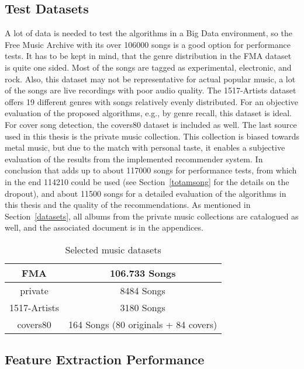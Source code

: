 \subsection{Test Datasets}\label{tdset}

A lot of data is needed to test the algorithms in a Big Data environment, so the Free Music Archive with its over 106000 songs is a good option for performance tests. It has to be kept in mind, that the genre distribution in the FMA dataset is quite one sided. Most of the songs are tagged as experimental, electronic, and rock. Also, this dataset may not be representative for actual popular music, a lot of the songs are live recordings with poor audio quality. %
The 1517-Artists dataset offers 19 different genres with songs relatively evenly distributed. For an objective evaluation of the proposed algorithms, e.g., by genre recall, this dataset is ideal. For cover song detection, the covers80 dataset is included as well.
The last source used in this thesis is the private music collection. This collection is biased towards metal music, but due to the match with personal taste, it enables a subjective evaluation of the results from the implemented recommender system.
In conclusion that adds up to about 117000 songs for performance tests, from which in the end 114210 could be used (see Section~\ref{totamsong} for the details on the dropout), and about 11500 songs for a detailed evaluation of the algorithms in this thesis and the quality of the recommendations. As mentioned in Section~\ref{datasets}, all albums from the private music collections are catalogued as well, and the associated document is in the appendices. 

\begin{table}[h]
	\begin{center}
		\begin{tabular}{|c||c|}
			\hline
			FMA & 106.733 Songs\\
			\hline
			private & 8484 Songs\\
			\hline
			1517-Artists & 3180 Songs\\
			\hline
			covers80 & 164 Songs (80 originals + 84 covers)\\
			\hline
		\end{tabular}
	\end{center}
	\caption{Selected music datasets}
	\label{used_dsets}
\end{table}
\FloatBarrier

\subsection{Feature Extraction Performance}


